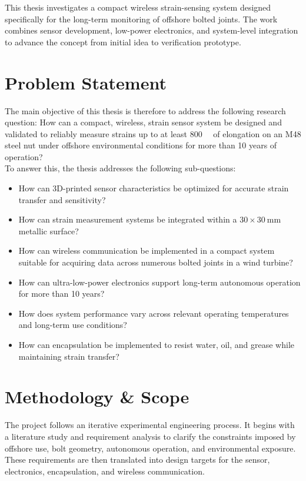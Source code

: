 This thesis investigates a compact wireless strain-sensing system designed specifically for the long-term monitoring of offshore bolted joints. The work combines sensor development, low-power electronics, and system-level integration to advance the concept from initial idea to verification prototype.

\section{Problem Statement}\label{sec:ProblemStatement}
The main objective of this thesis is therefore to address the following research question:
How can a compact, wireless, strain sensor system be designed and validated to reliably measure strains up to at least \SI{800}{\micro\strain} of elongation on an M48 steel nut under offshore environmental conditions for more than 10 years of operation?\\
To answer this, the thesis addresses the following sub-questions:

\begin{itemize}
    \item[-] How can 3D-printed sensor characteristics be optimized for accurate strain transfer and sensitivity?
    \item[-] How can strain measurement systems be integrated within a $30\times\SI{30}{\milli\meter}$ metallic surface?
    \item[-] How can wireless communication be implemented in a compact system suitable for acquiring data across numerous bolted joints in a wind turbine?
    \item[-] How can ultra-low-power electronics support long-term autonomous operation for more than 10 years?
    \item[-] How does system performance vary across relevant operating temperatures and long-term use conditions?
    \item[-] How can encapsulation be implemented to resist water, oil, and grease while maintaining strain transfer?
\end{itemize}

\section{Methodology \& Scope}
The project follows an iterative experimental engineering process. It begins with a literature study and requirement analysis to clarify the constraints imposed by offshore use, bolt geometry, autonomous operation, and environmental exposure. These requirements are then translated into design targets for the sensor, electronics, encapsulation, and wireless communication.

